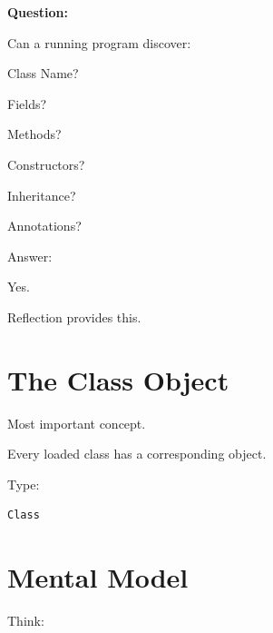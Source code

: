 \documentclass[11pt,a4paper]{book}
\begin{document}

\textbf{Question:}


Can a running program discover:


Class Name?

Fields?

Methods?

Constructors?

Inheritance?

Annotations?


Answer:


Yes.


Reflection provides this.


\section{The Class Object}

Most important concept.


Every loaded class has
a corresponding object.


Type:

\begin{verbatim} 
Class
\end{verbatim}


\section{Mental Model}

Think:

\end{document}
